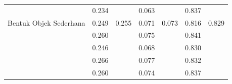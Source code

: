 \begin{table}[]
\begin{tabular}{|l|cc|cc|cc|}
                                                      & \multicolumn{1}{c|}{\cellcolor[HTML]{FFFFFF}0.234} & \cellcolor[HTML]{FFFFFF}                         & \multicolumn{1}{c|}{\cellcolor[HTML]{FFFFFF}0.063}  & \cellcolor[HTML]{FFFFFF}                           & \multicolumn{1}{c|}{\cellcolor[HTML]{FFFFFF}0.837} & \cellcolor[HTML]{FFFFFF}                        \\ \cline{2-2} \cline{4-4} \cline{6-6}
  \multirow{-5}{*}{Bentuk Objek Sederhana}          & \multicolumn{1}{c|}{\cellcolor[HTML]{FFFFFF}0.249} & \multirow{-5}{*}{\cellcolor[HTML]{FFFFFF}0.255}  & \multicolumn{1}{c|}{\cellcolor[HTML]{FFFFFF}0.071}  & \multirow{-5}{*}{\cellcolor[HTML]{FFFFFF}0.073}       & \multicolumn{1}{c|}{\cellcolor[HTML]{FFFFFF}0.816} & \multirow{-5}{*}{\cellcolor[HTML]{FFFFFF}0.829} \\ \hline
                                                      & \multicolumn{1}{c|}{0.260}                         & \cellcolor[HTML]{FFFFFF}                         & \multicolumn{1}{c|}{0.075}                         & \cellcolor[HTML]{FFFFFF}                           & \multicolumn{1}{c|}{0.841}                         & \cellcolor[HTML]{FFFFFF}                        \\ \cline{2-2} \cline{4-4} \cline{6-6}
                                                      & \multicolumn{1}{l|}{0.246}                         & \cellcolor[HTML]{FFFFFF}                         & \multicolumn{1}{l|}{0.068}                         & \cellcolor[HTML]{FFFFFF}                           & \multicolumn{1}{l|}{0.830}                         & \cellcolor[HTML]{FFFFFF}                        \\ \cline{2-2} \cline{4-4} \cline{6-6}
                                                      & \multicolumn{1}{l|}{0.266}                         & \cellcolor[HTML]{FFFFFF}                         & \multicolumn{1}{l|}{0.077}                          & \cellcolor[HTML]{FFFFFF}                           & \multicolumn{1}{l|}{0.832}                         & \cellcolor[HTML]{FFFFFF}                        \\ \cline{2-2} \cline{4-4} \cline{6-6}
                                                      & \multicolumn{1}{l|}{0.260}                         & \cellcolor[HTML]{FFFFFF}                         & \multicolumn{1}{l|}{0.074}                         & \cellcolor[HTML]{FFFFFF}                           & \multicolumn{1}{l|}{0.837}                         & \cellcolor[HTML]{FFFFFF}                        \\ \cline{2-2} \cline{4-4} \cline{6-6}

\end{tabular}
\end{table}

